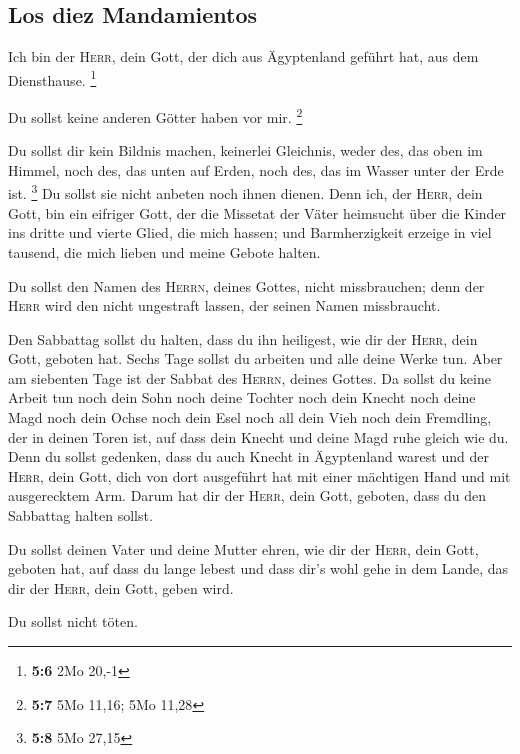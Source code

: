 \hypertarget{los-diez-mandamientos}{%
\subsection{Los diez Mandamientos}\label{los-diez-mandamientos}}

 Ich bin der \textsc{Herr}, dein Gott, der dich aus
Ägyptenland geführt hat, aus dem Diensthause. \footnote{\textbf{5:6} 2Mo
  20,-1}

 Du sollst keine anderen Götter haben vor mir. \footnote{\textbf{5:7}
  5Mo 11,16; 5Mo 11,28}

 Du sollst dir kein Bildnis machen, keinerlei Gleichnis,
weder des, das oben im Himmel, noch des, das unten auf Erden, noch des,
das im Wasser unter der Erde ist. \footnote{\textbf{5:8} 5Mo 27,15}
 Du sollst sie nicht anbeten noch ihnen dienen. Denn ich,
der \textsc{Herr}, dein Gott, bin ein eifriger Gott, der die Missetat
der Väter heimsucht über die Kinder ins dritte und vierte Glied, die
mich hassen;  und Barmherzigkeit erzeige in viel tausend,
die mich lieben und meine Gebote halten.

 Du sollst den Namen des \textsc{Herrn}, deines Gottes,
nicht missbrauchen; denn der \textsc{Herr} wird den nicht ungestraft
lassen, der seinen Namen missbraucht.

 Den Sabbattag sollst du halten, dass du ihn heiligest,
wie dir der \textsc{Herr}, dein Gott, geboten hat.  Sechs
Tage sollst du arbeiten und alle deine Werke tun.  Aber
am siebenten Tage ist der Sabbat des \textsc{Herrn}, deines Gottes. Da
sollst du keine Arbeit tun noch dein Sohn noch deine Tochter noch dein
Knecht noch deine Magd noch dein Ochse noch dein Esel noch all dein Vieh
noch dein Fremdling, der in deinen Toren ist, auf dass dein Knecht und
deine Magd ruhe gleich wie du.  Denn du sollst gedenken,
dass du auch Knecht in Ägyptenland warest und der \textsc{Herr}, dein
Gott, dich von dort ausgeführt hat mit einer mächtigen Hand und mit
ausgerecktem Arm. Darum hat dir der \textsc{Herr}, dein Gott, geboten,
dass du den Sabbattag halten sollst.

 Du sollst deinen Vater und deine Mutter ehren, wie dir
der \textsc{Herr}, dein Gott, geboten hat, auf dass du lange lebest und
dass dir's wohl gehe in dem Lande, das dir der \textsc{Herr}, dein Gott,
geben wird.

 Du sollst nicht töten.

